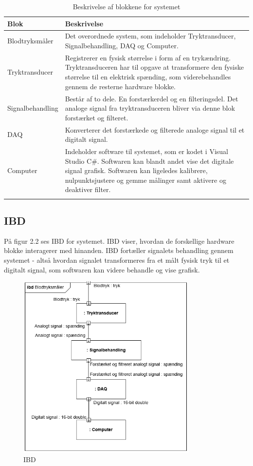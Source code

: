 \begin{longtabu} to 
	\textbf{Blok} &	\textbf{Beskrivelse} \\[-1ex]
	\midrule
	Blodtryksmåler & Det overordnede system, som indeholder Tryktransducer, Signalbehandling, DAQ og Computer.\\[-1ex]
	Tryktransducer & Registrerer en fysisk størrelse i form af en trykændring. Tryktransduceren har til opgave at transformere den fysiske størrelse til en elektrisk spænding, som viderebehandles gennem de resterne hardware blokke.  \\[-1ex]
	Signalbehandling & Består af to dele. En forstærkerdel og en filteringsdel. Det analoge signal fra tryktransduceren bliver via denne blok forstærket og filteret.\\[-1ex]
	DAQ & Konverterer det forstærkede og filterede analoge signal til et digitalt signal.\\[-1ex]
	Computer & Indeholder software til systemet, som er kodet i Visual Studio C\#. Softwaren kan blandt andet vise det digitale signal grafisk. Softwaren kan ligeledes kalibrere, nulpunktsjustere og gemme målinger samt aktivere og deaktiver filter.\\[-1ex]
	\caption{Beskrivelse af blokkene for systemet}
	\end{longtabu}
	
\subsection{IBD}
På figur 2.2 ses IBD for systemet. IBD viser, hvordan de forskellige hardware blokke interagerer med hinanden. IBD fortæller signalets behandling gennem systemet - altså hvordan signalet transformeres fra et målt fysisk tryk til et digitalt signal, som softwaren kan videre behandle og vise grafisk. 

\begin{figure}[H]
	\centering
	\includegraphics[width=0.8\textwidth]{Figurer/3}
	\caption{IBD}
	\label{fig:IBD}
\end{figure}


